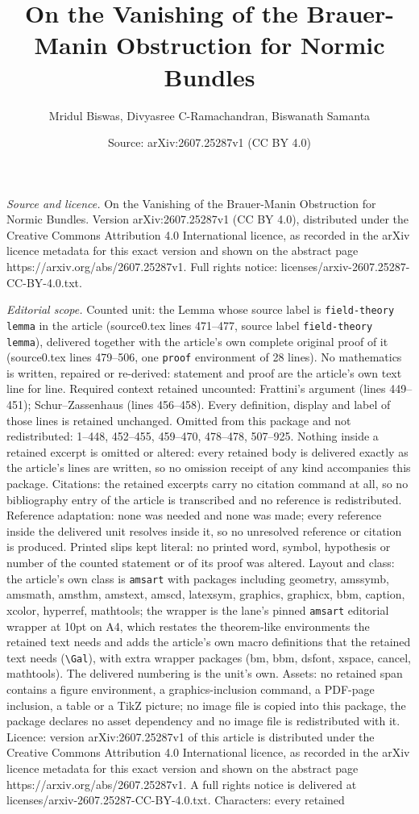 \documentclass[10pt,a4paper]{amsart}
\title[On the Vanishing of the Brauer-Manin Obstruction for Normic ]{On the Vanishing of the Brauer-Manin Obstruction for Normic Bundles}
\author{Mridul Biswas, Divyasree C-Ramachandran, Biswanath Samanta}
\date{Source: arXiv:2607.25287v1 (CC BY 4.0)}
\begin{document}
\maketitle

\noindent\emph{Source and licence.} On the Vanishing of the Brauer-Manin Obstruction for Normic Bundles. Version arXiv:2607.25287v1 (CC BY 4.0), distributed under the Creative Commons Attribution 4.0 International licence, as recorded in the arXiv licence metadata for this exact version and shown on the abstract page https://arxiv.org/abs/2607.25287v1. Full rights notice: licenses/arxiv-2607.25287-CC-BY-4.0.txt.\par\smallskip

\noindent\textit{Editorial scope.} Counted unit: the Lemma whose source label is \texttt{field-theory lemma} in the article (source0.tex lines 471--477, source label \texttt{field-theory lemma}), delivered together with the article's own complete original proof of it (source0.tex lines 479--506, one \texttt{proof} environment of 28 lines). No mathematics is written, repaired or re-derived: statement and proof are the article's own text line for line. Required context retained uncounted: Frattini's argument (lines 449--451); Schur--Zassenhaus (lines 456--458). Every definition, display and label of those lines is retained unchanged. Omitted from this package and not redistributed: 1--448, 452--455, 459--470, 478--478, 507--925. Nothing inside a retained excerpt is omitted or altered: every retained body is delivered exactly as the article's lines are written, so no omission receipt of any kind accompanies this package. Citations: the retained excerpts carry no citation command at all, so no bibliography entry of the article is transcribed and no reference is redistributed. Reference adaptation: none was needed and none was made; every reference inside the delivered unit resolves inside it, so no unresolved reference or citation is produced. Printed slips kept literal: no printed word, symbol, hypothesis or number of the counted statement or of its proof was altered. Layout and class: the article's own class is \texttt{amsart} with packages including geometry, amssymb, amsmath, amsthm, amstext, amscd, latexsym, graphics, graphicx, bbm, caption, xcolor, hyperref, mathtools; the wrapper is the lane's pinned \texttt{amsart} editorial wrapper at 10pt on A4, which restates the theorem-like environments the retained text needs and adds the article's own macro definitions that the retained text needs (\texttt{\textbackslash Gal}), with extra wrapper packages (bm, bbm, dsfont, xspace, cancel, mathtools). The delivered numbering is the unit's own. Assets: no retained span contains a figure environment, a graphics-inclusion command, a PDF-page inclusion, a table or a TikZ picture; no image file is copied into this package, the package declares no asset dependency and no image file is redistributed with it. Licence: version arXiv:2607.25287v1 of this article is distributed under the Creative Commons Attribution 4.0 International licence, as recorded in the arXiv licence metadata for this exact version and shown on the abstract page https://arxiv.org/abs/2607.25287v1. A full rights notice is delivered at licenses/arxiv-2607.25287-CC-BY-4.0.txt. Characters: every retained 
\end{document}
